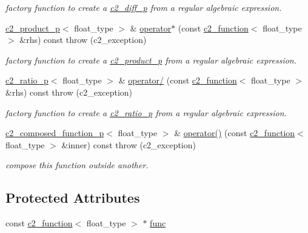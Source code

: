 \begin{DoxyCompactItemize}
\begin{DoxyCompactList}\small\item\em factory function to create a \hyperlink{classc2__diff__p}{c2\+\_\+diff\+\_\+p} from a regular algebraic expression. \end{DoxyCompactList}\item 
\hyperlink{classc2__product__p}{c2\+\_\+product\+\_\+p}$<$ float\+\_\+type $>$ \& \hyperlink{classc2__const__ptr_a7be0220692df9d2118a14ee855d617be}{operator$\ast$} (const \hyperlink{classc2__function}{c2\+\_\+function}$<$ float\+\_\+type $>$ \&rhs) const   throw (c2\+\_\+exception)
\begin{DoxyCompactList}\small\item\em factory function to create a \hyperlink{classc2__product__p}{c2\+\_\+product\+\_\+p} from a regular algebraic expression. \end{DoxyCompactList}\item 
\hyperlink{classc2__ratio__p}{c2\+\_\+ratio\+\_\+p}$<$ float\+\_\+type $>$ \& \hyperlink{classc2__const__ptr_ae3487ff977e84cd98e0ae1c495903766}{operator/} (const \hyperlink{classc2__function}{c2\+\_\+function}$<$ float\+\_\+type $>$ \&rhs) const   throw (c2\+\_\+exception)
\begin{DoxyCompactList}\small\item\em factory function to create a \hyperlink{classc2__ratio__p}{c2\+\_\+ratio\+\_\+p} from a regular algebraic expression. \end{DoxyCompactList}\item 
\hyperlink{classc2__composed__function__p}{c2\+\_\+composed\+\_\+function\+\_\+p}$<$ float\+\_\+type $>$ \& \hyperlink{classc2__const__ptr_a0fc370d82f1077fa7054e1a10a93ed6c}{operator()} (const \hyperlink{classc2__function}{c2\+\_\+function}$<$ float\+\_\+type $>$ \&inner) const   throw (c2\+\_\+exception)
\begin{DoxyCompactList}\small\item\em compose this function outside another. \end{DoxyCompactList}\end{DoxyCompactItemize}
\subsection*{Protected Attributes}
\begin{DoxyCompactItemize}
\item 
const \hyperlink{classc2__function}{c2\+\_\+function}$<$ float\+\_\+type $>$ $\ast$ \hyperlink{classc2__const__ptr_a6de6b341a9e28137557dbe496813e415}{func}
\end{DoxyCompactItemize}


